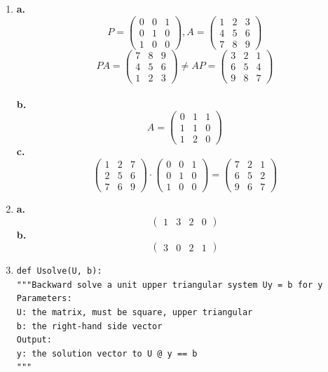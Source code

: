 \documentclass[11pt]{article}
\begin{document}
\begin{enumerate}
\item 
{\bf a.} $$P =
\left(
\begin{array}{ccc}
0 & 0 & 1\\ 
0 & 1 & 0\\
1 & 0 & 0
\end{array} \right), A = 
\left(
\begin{array}{ccc}
1 & 2 & 3\\
4 & 5 & 6\\
7 & 8 & 9
\end{array} \right)
$$
$$
PA = 
\left(
\begin{array}{ccc}
7&8&9\\
4 & 5 & 6\\
1&2&3
\end{array} \right) \neq
AP = \left( \begin{array}{ccc}
3&2&1\\
6&5&4\\
9&8&7
\end{array} \right)
$$\\
{\bf b.} 
$$
A = \left(
\begin{array}{ccc}
	0 & 1 & 1\\ 	
	1 & 1 & 0\\
	1 & 2 & 0
\end{array} \right)
$$
{\bf c.}
$$
\left(
\begin{array}{ccc}
1 & 2 & 7\\
2 & 5 & 6\\
7 & 6 & 9
\end{array} \right) \cdot
\left(
\begin{array}{ccc}
0 & 0 & 1\\
0 & 1 & 0\\
1 & 0 & 0
\end{array} \right) = 
\left(
\begin{array}{ccc}
7 & 2 & 1\\
6 & 5 & 2\\
9 & 6 & 7
\end{array} \right)
$$

\item 
{\bf a.}
$$
\left(
\begin{array}{cccc}
	1 & 3 & 2 & 0
\end{array} \right)
$$
{\bf b.}
$$
\left(
\begin{array}{cccc}
3 & 0 & 2 & 1
\end{array} \right)
$$

\item 
\lstset{language=Python}
\lstset{frame=lines}
\lstset{basicstyle=\footnotesize}
\begin{lstlisting}
def Usolve(U, b):
"""Backward solve a unit upper triangular system Uy = b for y
Parameters: 
U: the matrix, must be square, upper triangular
b: the right-hand side vector
Output:
y: the solution vector to U @ y == b
"""


\end{lstlisting}
\end{enumerate}
\end{document}
